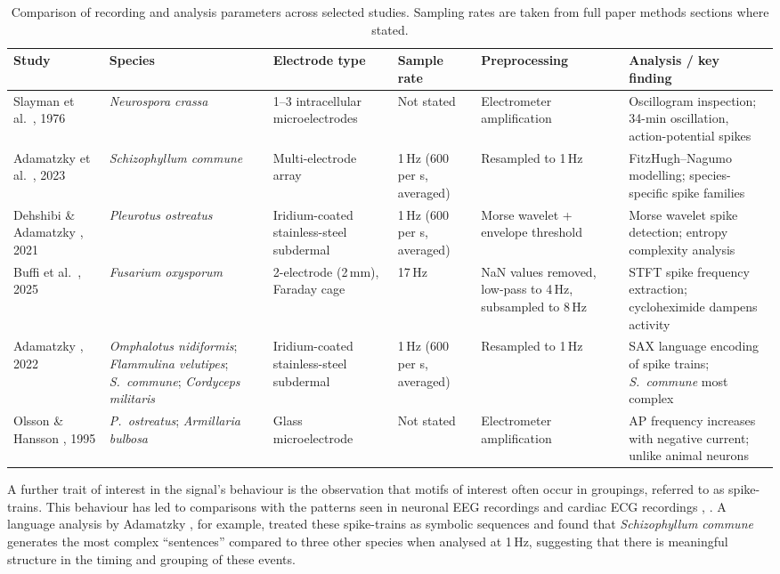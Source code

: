 \begin{table}[htbp]
\caption[{Comparison of recording and analysis parameters across selected studies.}]{Comparison of recording and analysis parameters across selected studies. Sampling rates are taken from full paper methods sections where stated.}
\label{tab:params}
\footnotesize
\begin{tabularx}{\textwidth}{p{2.1cm} p{2.3cm} p{2.2cm} p{1.7cm} p{2.4cm} X}
\toprule
\textbf{Study} & \textbf{Species} & \textbf{Electrode type} & \textbf{Sample rate} & \textbf{Preprocessing} & \textbf{Analysis / key finding}\\
\midrule
Slayman et al.\ \cite{slayman}, 1976 & \emph{Neurospora crassa} & 1--3 intracellular microelectrodes & Not stated & Electrometer amplification & Oscillogram inspection; 34-min oscillation, action-potential spikes\\
\addlinespace
Adamatzky et al.\ \cite{adamatzky2023}, 2023 & \emph{Schizophyllum commune} & Multi-electrode array & 1\,Hz (600 per s, averaged) & Resampled to 1\,Hz & FitzHugh--Nagumo modelling; species-specific spike families\\
\addlinespace
Dehshibi \& Adamatzky \cite{dehshibi}, 2021 & \emph{Pleurotus ostreatus} & Iridium-coated stainless-steel subdermal & 1\,Hz (600 per s, averaged) & Morse wavelet + envelope threshold & Morse wavelet spike detection; entropy complexity analysis\\
\addlinespace
Buffi et al.\ \cite{buffi}, 2025 & \emph{Fusarium oxysporum} & 2-electrode (2\,mm), Faraday cage & 17\,Hz & NaN values removed, low-pass to 4\,Hz, subsampled to 8\,Hz & STFT spike frequency extraction; cycloheximide dampens activity\\
\addlinespace
Adamatzky \cite{adamatzky2022}, 2022 & \emph{Omphalotus nidiformis}; \emph{Flammulina velutipes}; \emph{S.\ commune}; \emph{Cordyceps militaris} & Iridium-coated stainless-steel subdermal & 1\,Hz (600 per s, averaged) & Resampled to 1\,Hz & SAX language encoding of spike trains; \emph{S.\ commune} most complex\\
\addlinespace
Olsson \& Hansson \cite{olsson}, 1995 & \emph{P.\ ostreatus}; \emph{Armillaria bulbosa} & Glass microelectrode & Not stated & Electrometer amplification & AP frequency increases with negative current; unlike animal neurons\\
\bottomrule
\end{tabularx}
\end{table}


A further trait of interest in the signal's behaviour is the observation that motifs of interest often occur in groupings, referred to as spike-trains. This behaviour has led to comparisons with the patterns seen in neuronal EEG recordings and cardiac ECG recordings \cite{slayman}, \cite{adamatzky2023}. A language analysis by Adamatzky \cite{adamatzky2022}, for example, treated these spike-trains as symbolic sequences and found that \emph{Schizophyllum commune} generates the most complex ``sentences'' compared to three other species when analysed at 1\,Hz, suggesting that there is meaningful structure in the timing and grouping of these events.

